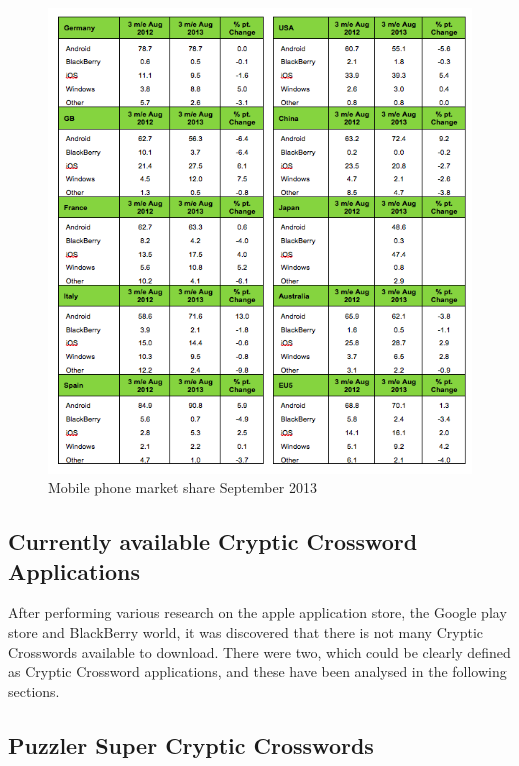 \newpage
\begin{figure}[H]
  \centering
  \includegraphics[scale=0.75]{forbeslist13.png}
  \caption{Mobile phone market share September 2013}
\end{figure}

\begin{flushright}
\citep{forbes13}
\end{flushright}

\subsection{Currently available Cryptic Crossword Applications}

After performing various research on the apple application store, the Google
play store and BlackBerry world, it was discovered that there is not many
Cryptic Crosswords available to download. There were two, which could be clearly
defined as Cryptic Crossword applications, and these have been analysed in the
following sections.

\subsection{Puzzler Super Cryptic Crosswords}


